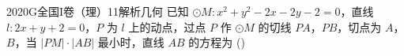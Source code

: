 
\begin{problem}{2020}{G}{全国I卷（理）}{11}{解析几何}
已知 $ \odot M: x^2 + y^2 - 2x - 2y - 2 = 0 $，直线 $ l: 2x + y + 2 = 0 $，$ P $ 为 $ l $ 上的动点，过点 $ P $ 作 $ \odot M $ 的切线 $ PA $，$ PB $，切点为 $ A $，$ B $，当 $ |PM| \cdot |AB| $ 最小时，直线 $ AB $ 的方程为 (\hspace{1cm})
\begin{choices}
\end{choices}
\end{problem}

\begin{answer}

\end{answer}

\begin{solutions}

\end{solutions}